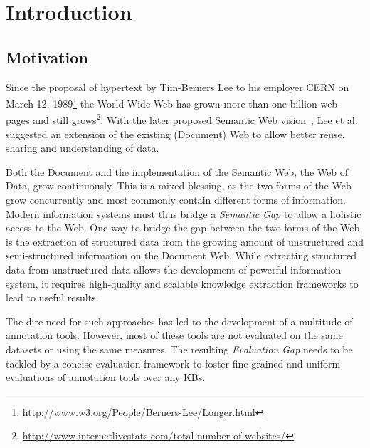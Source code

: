 \chapter{Introduction}

\section*{Motivation}

Since the proposal of hypertext by Tim-Berners Lee to his employer CERN on March 12, 1989\footnote{\url{http://www.w3.org/People/Berners-Lee/Longer.html}} the World Wide Web has grown more than one billion web pages and still grows\footnote{\url{http://www.internetlivestats.com/total-number-of-websites/}}.
With the later proposed Semantic Web vision~\cite{bernerslee2001semantic}, Lee et al. suggested an extension of the existing (Document) Web to allow better reuse, sharing and understanding of data.

Both the Document and the implementation of the Semantic Web, the Web of Data, grow continuously. 
This is a mixed blessing, as the two forms of the Web grow concurrently and most commonly contain different forms of information. 
Modern information systems must thus bridge a \emph{Semantic Gap} to allow a holistic access to the Web. 
One way to bridge the gap between the two forms of the Web is the extraction of structured data from the growing amount of unstructured and semi-structured information on the Document Web. 
While extracting structured data from unstructured data allows the development of powerful information system, it requires high-quality and scalable knowledge extraction frameworks to lead to useful results. 

The dire need for such approaches has led to the development of a multitude of annotation tools. 
However, most of these tools are not evaluated on the same datasets or using the same measures.
The resulting \emph{Evaluation Gap} needs to be tackled by a concise evaluation framework to foster fine-grained and uniform evaluations of annotation tools over any \ac{KB}s.

